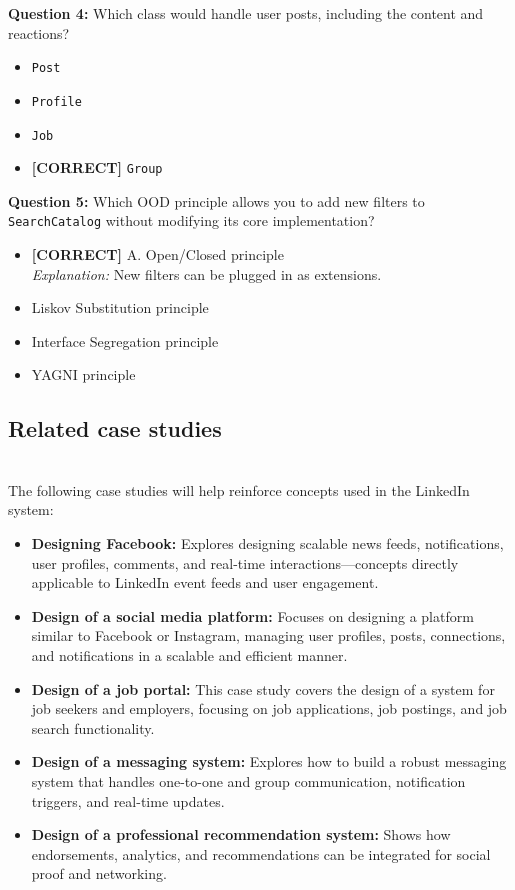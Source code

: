 \vspace{0.3cm}
\noindent
\textbf{Question 4:} Which class would handle user posts, including the content and reactions?
\\[0.2cm]
\begin{itemize}
 \item \texttt{Post}
 \item \texttt{Profile}
 \item \texttt{Job}
 \item \textbf{[CORRECT]} \texttt{Group}
\end{itemize}
\vspace{0.3cm}
\noindent
\textbf{Question 5:} Which OOD principle allows you to add new filters to \texttt{SearchCatalog} without modifying its core implementation?
\\[0.2cm]
\begin{itemize}
 \item \textbf{[CORRECT]} A. Open/Closed principle
\\[0.1cm]
\textit{Explanation:} 
New filters can be plugged in as extensions.
 \item Liskov Substitution principle
 \item Interface Segregation principle
 \item YAGNI principle
\end{itemize}

\subsection{Related case studies}\label{s365sWNflPmDXl40tjhpW}
\\
The following case studies will help reinforce concepts used in the LinkedIn system:

\begin{itemize}
\item
\textbf{Designing Facebook:} Explores designing scalable news feeds, notifications, user profiles, comments, and real-time interactions---concepts directly applicable to LinkedIn event feeds and user engagement.
\item
\textbf{Design of a social media platform:} Focuses on designing a platform similar to Facebook or Instagram, managing user profiles, posts, connections, and notifications in a scalable and efficient manner.
\item
\textbf{Design of a job portal:} This case study covers the design of a system for job seekers and employers, focusing on job applications, job postings, and job search functionality.
\item
\textbf{Design of a messaging system:} Explores how to build a robust messaging system that handles one-to-one and group communication, notification triggers, and real-time updates.
\item
\textbf{Design of a professional recommendation system:} Shows how endorsements, analytics, and recommendations can be integrated for social proof and networking.
\end{itemize}

